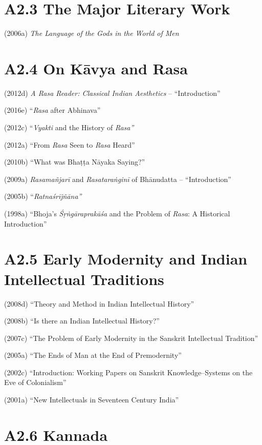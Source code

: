 \vspace{-.4cm}

\section*{A2.3 The Major Literary Work}

(2006a) \textit{The Language of the Gods in the World of Men}

\vspace{-.4cm}

\section*{A2.4 On Kāvya and Rasa}

(2012d) \textit{A Rasa Reader: Classical Indian Aesthetics} – “Introduction” 

(2016e) “\textit{Rasa} after Abhinava”

(2012c) “\textit{Vyakti} and the History of \textit{Rasa”}

(2012a) “From \textit{Rasa} Seen to \textit{Rasa} Heard”

(2010b) “What was Bhaṭṭa Nāyaka Saying?”

(2009a) \textit{Rasamañjarī} and \textit{Rasataraṅginī} of Bhānudatta – “Introduction”

(2005b) “\textit{Ratnaśrījñāna”}

(1998a) “Bhoja's \textit{Śṛṅgāraprakāśa} and the Problem of \textit{Rasa}: A Historical Introduction”

\vspace{-.3cm}

\section*{A2.5 Early Modernity and Indian Intellectual Traditions}

(2008d) “Theory and Method in Indian Intellectual History”

(2008b) “Is there an Indian Intellectual History?”

(2007c) “The Problem of Early Modernity in the Sanskrit Intellectual Tradition”

(2005a) “The Ends of Man at the End of Premodernity”

(2002c) “Introduction: Working Papers on Sanskrit Knowledge–Systems on the Eve of Colonialism”

(2001a) “New Intellectuals in Seventeen Century India”


\section*{A2.6 Kannada}

